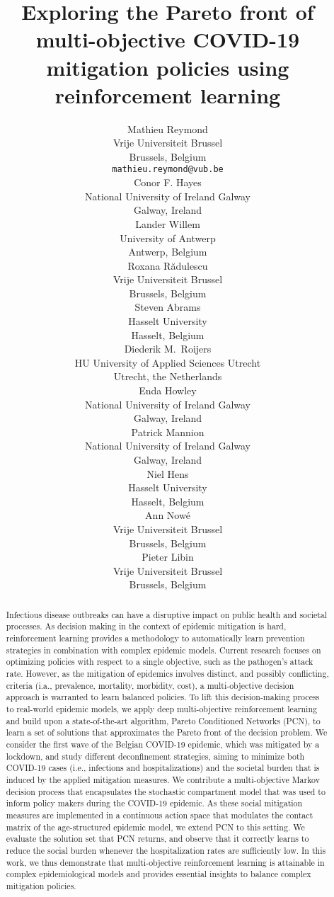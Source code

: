 \documentclass{article}
\title{Exploring the Pareto front of multi-objective COVID-19 mitigation policies using reinforcement learning}
\date{}
\author{Mathieu Reymond \\
	Vrije Universiteit Brussel\\
	Brussels, Belgium \\
	\texttt{mathieu.reymond@vub.be} \\
	\And
	Conor F. Hayes \\
	National University of Ireland Galway\\
	Galway, Ireland\\
	\And
	Lander Willem \\
	University of Antwerp \\
	Antwerp, Belgium \\
	\And
	Roxana R\u{a}dulescu \\
	Vrije Universiteit Brussel\\
	Brussels, Belgium \\
	\And
	Steven Abrams \\
	Hasselt University \\
	Hasselt, Belgium \\
	\And
	Diederik M.\ Roijers \\
	HU University of Applied Sciences Utrecht \\
	Utrecht, the Netherlands \\
	\And
	Enda Howley \\
	National University of Ireland Galway\\
	Galway, Ireland\\
	\And
	Patrick Mannion \\
	National University of Ireland Galway\\
	Galway, Ireland\\
	\And
	Niel Hens \\
	Hasselt University \\
	Hasselt, Belgium \\
	\And
	Ann Now\'{e} \\
	Vrije Universiteit Brussel\\
	Brussels, Belgium \\
	\And
	Pieter Libin \\
	Vrije Universiteit Brussel\\
	Brussels, Belgium \\
}
\begin{document}
\maketitle

\begin{abstract}
Infectious disease outbreaks can have a disruptive impact on public health and societal processes. As decision making in the context of epidemic mitigation is hard, reinforcement learning provides a methodology to automatically learn prevention strategies in combination with complex epidemic models. Current research focuses on optimizing policies with respect to a single objective, such as the pathogen's attack rate. However, as the mitigation of epidemics involves distinct, and possibly conflicting, criteria (i.a., prevalence, mortality, morbidity, cost), a multi-objective decision approach is warranted to learn balanced policies. To lift this decision-making process to real-world epidemic models, we apply deep multi-objective reinforcement learning and build upon a state-of-the-art algorithm, Pareto Conditioned Networks (PCN), to learn a set of solutions that approximates the Pareto front of the decision problem. We consider the first wave of the Belgian COVID-19 epidemic, which was mitigated by a lockdown, and study different deconfinement strategies, aiming to minimize both COVID-19 cases (i.e., infections and hospitalizations) and the societal burden that is induced by the applied mitigation measures. We contribute a multi-objective Markov decision process that encapsulates the stochastic compartment model that was used to inform policy makers during the COVID-19 epidemic. As these social mitigation measures are implemented in a continuous action space that modulates the contact matrix of the age-structured epidemic model, we extend PCN to this setting. We evaluate the solution set that PCN returns, and observe that it correctly learns to reduce the social burden whenever the hospitalization rates are sufficiently low. In this work, we thus demonstrate that multi-objective reinforcement learning is attainable in complex epidemiological models and provides essential insights to balance complex mitigation policies.
\end{abstract}



\end{document}
